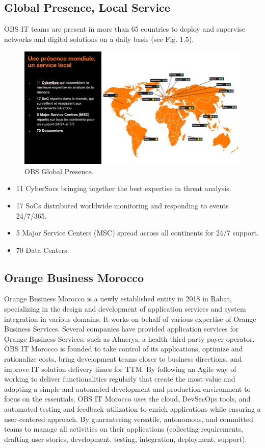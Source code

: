 \subsection{Global Presence, Local Service}
OBS IT teams are present in more than 65 countries to deploy and supervise networks and digital solutions on a daily basis (see Fig. 1.5).

\begin{figure}[hbt!]
  \centering
  \includegraphics[width=15cm]{Figures/monde.png}
  \caption{OBS Global Presence.}
  \label{fig:vue-snoc-pos}
\end{figure}

\begin{itemize}
    \item 11 CyberSocs bringing together the best expertise in threat analysis.
    \item 17 SoCs distributed worldwide monitoring and responding to events 24/7/365.
    \item 5 Major Service Centers (MSC) spread across all continents for 24/7 support.
    \item 70 Data Centers.
\end{itemize}

\subsection{Orange Business Morocco}
Orange Business Morocco is a newly established entity in 2018 in Rabat, specializing in the design and development of application services and system integration in various domains. It works on behalf of various expertise of Orange Business Services. Several companies have provided application services for Orange Business Services, such as Almerys, a health third-party payer operator. OBS IT Morocco is founded to take control of its applications, optimize and rationalize costs, bring development teams closer to business directions, and improve IT solution delivery times for TTM. By following an Agile way of working to deliver functionalities regularly that create the most value and adopting a simple and automated development and production environment to focus on the essentials. OBS IT Morocco uses the cloud, DevSecOps tools, and automated testing and feedback utilization to enrich applications while ensuring a user-centered approach. By guaranteeing versatile, autonomous, and committed teams to manage all activities on their applications (collecting requirements, drafting user stories, development, testing, integration, deployment, support).

